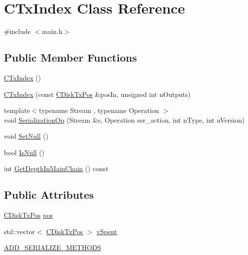 \hypertarget{class_c_tx_index}{}\section{C\+Tx\+Index Class Reference}
\label{class_c_tx_index}


{\ttfamily \#include $<$main.\+h$>$}

\subsection*{Public Member Functions}
\begin{DoxyCompactItemize}
\item 
\hyperlink{class_c_tx_index_a08f6b57bc2852af37dd5a13b9d5877cc}{C\+Tx\+Index} ()
\item 
\hyperlink{class_c_tx_index_ad01109597d73bef7ea576d1e1613415f}{C\+Tx\+Index} (const \hyperlink{class_c_disk_tx_pos}{C\+Disk\+Tx\+Pos} \&pos\+In, unsigned int n\+Outputs)
\item 
{\footnotesize template$<$typename Stream , typename Operation $>$ }\\void \hyperlink{class_c_tx_index_a8d7003336ce67c83268dac7dcae14199}{Serialization\+Op} (Stream \&s, Operation ser\+\_\+action, int n\+Type, int n\+Version)
\item 
void \hyperlink{class_c_tx_index_a379327d4654c726dea38486f1c1f800d}{Set\+Null} ()
\item 
bool \hyperlink{class_c_tx_index_a27f2d2e6bc1fad724bd5bff9eeb694fc}{Is\+Null} ()
\item 
int \hyperlink{class_c_tx_index_ab6119cf086e8e4b2c690f36c15479220}{Get\+Depth\+In\+Main\+Chain} () const 
\end{DoxyCompactItemize}
\subsection*{Public Attributes}
\begin{DoxyCompactItemize}
\item 
\hyperlink{class_c_disk_tx_pos}{C\+Disk\+Tx\+Pos} \hyperlink{class_c_tx_index_ac68a69ed4335b3f50b954c71ec0a9c32}{pos}
\item 
std\+::vector$<$ \hyperlink{class_c_disk_tx_pos}{C\+Disk\+Tx\+Pos} $>$ \hyperlink{class_c_tx_index_a88317d56c02acd1faec4863bcb293d2c}{v\+Spent}
\item 
\hyperlink{class_c_tx_index_a1bafe447bd4fcead6588a984167a7c36}{A\+D\+D\+\_\+\+S\+E\+R\+I\+A\+L\+I\+Z\+E\+\_\+\+M\+E\+T\+H\+O\+D\+S}
\end{DoxyCompactItemize}
